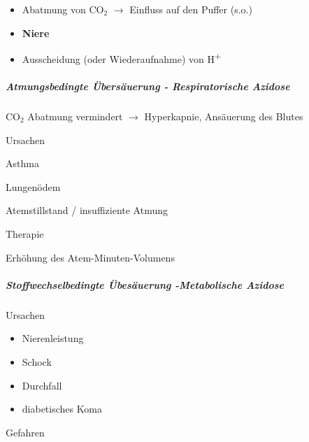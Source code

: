 \documentclass{article}
\newcommand\gSub[1]{\ensuremath{{}_{\text{#1}}}}
\begin{document}
\begin{itemize}
\item {\mdseries
Abatmung von CO\gSub{2} ${\rightarrow}$ Einfluss auf den Puffer
(s.o.)}

\end{itemize}
\begin{itemize}
\item {\bfseries
Niere}

\end{itemize}
\begin{itemize}
\item {\mdseries
Ausscheidung (oder Wiederaufnahme)  von H\textsuperscript{+}}

\end{itemize}
\subparagraph[Atmungsbedingte \"Ubers\"auerung - Respiratorische
Azidose]{Atmungsbedingte \"Ubers\"auerung - Respiratorische Azidose}
\label{bkm:RefHeading35233321}

{\mdseries
CO\gSub{2}  Abatmung vermindert ${\rightarrow}$ Hyperkapnie, 
Ans\"auerung des Blutes}

{\mdseries\color{black}
Ursachen}

{\mdseries
Asthma}

{\mdseries
Lungen\"odem}

{\mdseries
Atemstillstand / insuffiziente Atmung}

{\mdseries\color{black}
Therapie}

{\mdseries
Erh\"ohung des Atem-Minuten-Volumens}

\subparagraph[Stoffwechselbedingte \"Ubes\"auerung -Metabolische
Azidose]{Stoffwechselbedingte \"Ubes\"auerung -Metabolische Azidose}

{\mdseries\color{black}
Ursachen}

\begin{itemize}
\item {\mdseries
Nierenleistung }

\item {\mdseries
Schock}

\item {\mdseries
Durchfall}

\item {\mdseries
diabetisches Koma}

\end{itemize}
{\mdseries\color{black}
Gefahren}
\end{document}
